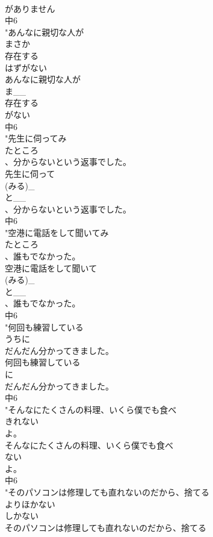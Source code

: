 \documentclass[8pt]{extreport}
\begin{document}
\begin{CJK}{UTF8}{min}
\\	がありません
\\	中6
\\	"あんなに親切な人が
\\	まさか
\\	存在する
\\	はずがない
\\	あんなに親切な人が
\\	ま__
\\	存在する
\\	がない
\\	中6
\\	"先生に伺ってみ
\\	たところ
\\	、分からないという返事でした。
\\	先生に伺って
\\	(みる)_
\\	と__
\\	、分からないという返事でした。
\\	中6
\\	"空港に電話をして聞いてみ
\\	たところ
\\	、誰もでなかった。
\\	空港に電話をして聞いて
\\	(みる)_
\\	と__
\\	、誰もでなかった。
\\	中6
\\	"何回も練習している
\\	うちに
\\	だんだん分かってきました。
\\	何回も練習している
\\	に
\\	だんだん分かってきました。
\\	中6
\\	"そんなにたくさんの料理、いくら僕でも食べ
\\	きれない
\\	よ。
\\	そんなにたくさんの料理、いくら僕でも食べ
\\	ない
\\	よ。
\\	中6
\\	"そのパソコンは修理しても直れないのだから、捨てる
\\	よりほかない
\\	しかない	
\\	そのパソコンは修理しても直れないのだから、捨てる

\end{CJK}
\end{document}
